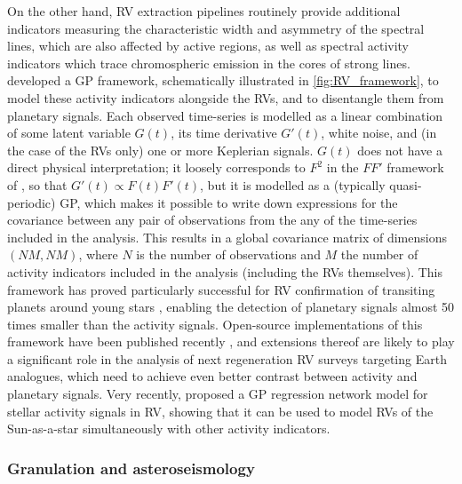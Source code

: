 \documentclass[letterpaper]{ar-1col}
\begin{document}
On the other hand, RV extraction pipelines routinely provide additional indicators measuring the characteristic width and asymmetry of the spectral lines, which are also affected by active regions, as well as spectral activity indicators which trace chromospheric emission in the cores of strong lines. \citet{2015MNRAS.452.2269R} developed a GP framework, schematically illustrated in \autoref{fig:RV_framework}, to model these activity indicators alongside the RVs, and to disentangle them from planetary signals. Each observed time-series is modelled as a linear combination of some latent variable $G(t)$, its time derivative $G'(t)$, white noise, and (in the case of the RVs only) one or more Keplerian signals. $G(t)$ does not have a direct physical interpretation; it loosely corresponds to $F^2$ in the $FF'$ framework of \citet{2012MNRAS.419.3147A}, so that $G'(t) \propto F(t) F'(t)$, but it is modelled as a (typically quasi-periodic) GP, which makes it possible to write down expressions for the covariance between any pair of observations from the any of the time-series included in the analysis. This results in a global covariance matrix of dimensions $(NM,NM)$, where $N$ is the number of observations and $M$ the number of activity indicators included in the analysis (including the RVs themselves). This framework has proved particularly successful for RV confirmation of transiting planets around young stars \citep{2019MNRAS.490..698B,2022MNRAS.512.3060Z}, enabling the detection of planetary signals almost 50 times smaller than the activity signals.  Open-source implementations of this framework have been published recently \citep{2022MNRAS.509..866B,2022A&A...659A.182D}, and extensions thereof are likely to play a significant role in the analysis of next regeneration RV surveys targeting Earth analogues, which need to achieve even better contrast between activity and planetary signals. Very recently,  \citet{2022arXiv220506627C} proposed a GP regression network model for stellar activity signals in RV, showing that it can be used to model RVs of the Sun-as-a-star simultaneously with other activity indicators.

\subsubsection{Granulation and asteroseismology}
\end{document}
